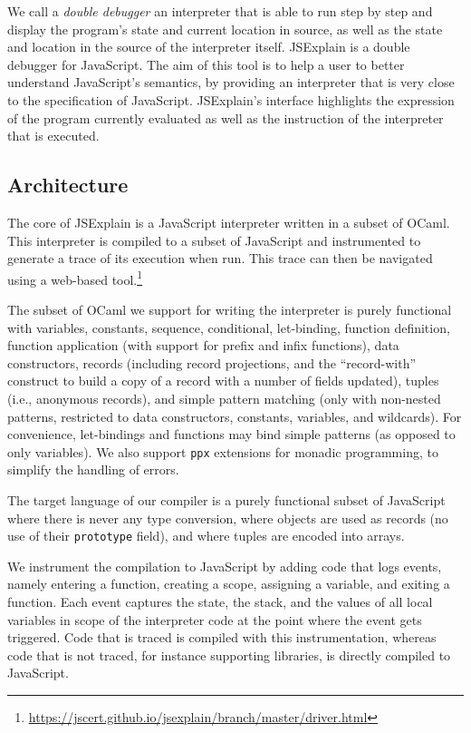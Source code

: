 \documentclass[twocolumn]{article}
\begin{document}
We call a \emph{double debugger} an interpreter that is able to run step by step
and display the program's state and current location in source, as well as the
state and location in the source of the interpreter itself. JSExplain is a
double debugger for JavaScript. The aim of this tool is to help a user to better
understand JavaScript's semantics, by providing an interpreter that is very
close to the specification of JavaScript. JSExplain's interface highlights the
expression of the program currently evaluated as well as the instruction of the
interpreter that is executed.

\subsection{Architecture}

The core of JSExplain is a JavaScript interpreter written in a subset of OCaml.
This interpreter is compiled to a subset of JavaScript and instrumented to
generate a trace of its execution when run. This trace can then be navigated
using a web-based
tool.\footnote{\url{https://jscert.github.io/jsexplain/branch/master/driver.html}}

The subset of OCaml we support for writing the interpreter is purely functional
with variables, constants, sequence, conditional, let-binding, function
definition, function application (with support for prefix and infix functions),
data constructors, records (including record projections, and the
``record-with'' construct to build a copy of a record with a number of fields
updated), tuples (i.e., anonymous records), and simple pattern matching (only
with non-nested patterns, restricted to data constructors, constants, variables,
and wildcards). For convenience, let-bindings and functions may bind simple
patterns (as opposed to only variables). We also support \texttt{ppx} extensions
for monadic programming, to simplify the handling of errors.

The target language of our compiler is a purely functional subset of JavaScript
where there is never any type conversion, where objects are used as records (no
use of their \texttt{prototype} field), and where tuples are encoded into
arrays.

We instrument the compilation to JavaScript by adding code that logs events,
namely entering a function, creating a scope, assigning a variable, and exiting
a function. Each event captures the state, the stack, and the values of all
local variables in scope of the interpreter code at the point where the event
gets triggered. Code that is traced is compiled with this instrumentation,
whereas code that is not traced, for instance supporting libraries, is directly
compiled to JavaScript.
\end{document}
